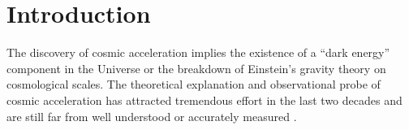 \documentclass[iop]{emulateapj}
\begin{document}




\section{Introduction}

The discovery of cosmic acceleration \citep{Riess1998,Perl1999} implies the existence of a ``dark energy'' component in the Universe 
or the breakdown of Einstein's gravity theory on cosmological scales.
The theoretical explanation and observational probe of cosmic acceleration has attracted 
tremendous effort in the last two decades and are still far from well understood or accurately measured \citep{SW1989,Li2011,DHW2013}.
\end{document}
